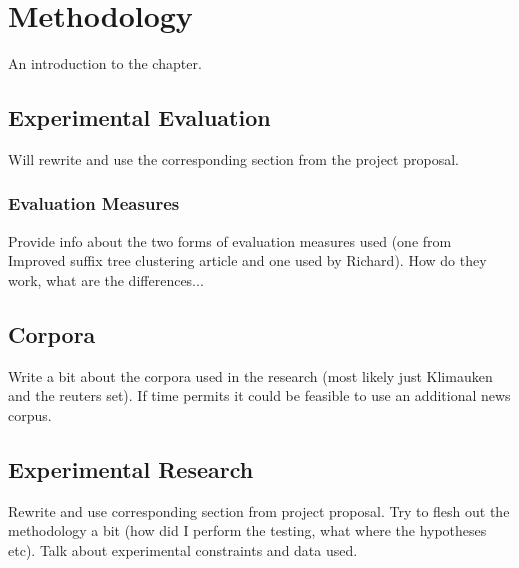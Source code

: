 
\chapter{Methodology} %

\label{Methodology} %


An introduction to the chapter.

\section{Experimental Evaluation}
\label{ExperimentalEvaluation}
Will rewrite and use the corresponding section from the project proposal.

\subsection{Evaluation Measures}
Provide info about the two forms of evaluation measures used (one from Improved suffix tree clustering article and one used by Richard). How do they work, what are the differences...

\section{Corpora}
\label{Corpora}
Write a bit about the corpora used in the research (most likely just Klimauken and the reuters set). If time permits it could be feasible to use an additional news corpus.

\section{Experimental Research}
\label{ExperimentalResearch}
Rewrite and use corresponding section from project proposal. Try to flesh out the methodology a bit (how did I perform the testing, what where the hypotheses etc). Talk about experimental constraints and data used.